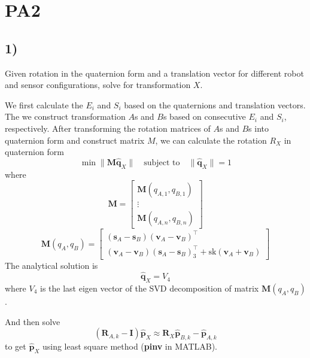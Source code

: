 \documentclass[english,10pt,a4paper]{book}
\begin{document}
    \section{PA2}
    \subsection*{1)}
    Given rotation in the quaternion form and a translation vector for different robot and sensor configurations, solve for transformation $X$.
    
    We first calculate the $E_i$ and $S_i$ based on the quaternions and translation vectors. The we construct transformation $A$s and $B$s based on consecutive $E_i$ and $S_i$, respectively. After transforming the rotation matrices of $A$s and $B$s into quaternion form and construct matrix $M$, we can calculate the rotation $R_X$ in quaternion form
    \begin{equation}
    	\min \|\mathbf{M} \hat{\mathbf{q}}_X\| \quad \text{subject to} \quad 	\|\hat{\mathbf{q}}_X\| = 1
    \end{equation}
    where
    \begin{equation}
    	\mathbf{M} = \begin{bmatrix}
    		\mathbf{M}(q_{A,1}, q_{B,1})\\
    		\vdots \\
    		\mathbf{M}(q_{A,n}, q_{B,n})
    	\end{bmatrix}
    \end{equation}
    \begin{equation}
    	\mathbf{M}(q_{A}, q_{B}) = \begin{bmatrix}
    		\left( \mathbf{s}_A - \mathbf{s}_B \right) \left( \mathbf{v}_A - \mathbf{v}_B 	\right)^{\top} \\
    		\left( \mathbf{v}_A - \mathbf{v}_B \right) \left( \mathbf{s}_A - \mathbf{s}_B 	\right)^{\top}_3 + \text{sk} \left( \mathbf{v}_A + \mathbf{v}_B \right)
    	\end{bmatrix}
    \end{equation}
    The analytical solution is
    \begin{equation}
    	\hat{\mathbf{q}}_X = V_4
    \end{equation}
    where $V_4$ is the last eigen vector of the SVD decomposition of matrix $\mathbf{M}(q_{A}, q_{B})$.
    
    And then solve 
    \begin{equation}
    	\left( \mathbf{R}_{A,k} - \mathbf{I} \right) \hat{\mathbf{p}}_X \approx \mathbf{R}_X 	\hat{\mathbf{p}}_{B,k} - \hat{\mathbf{p}}_{A,k}
    \end{equation}
    to get $\hat{\mathbf{p}}_X$ using least square method (\textbf{pinv} in MATLAB).
    
\end{document}
